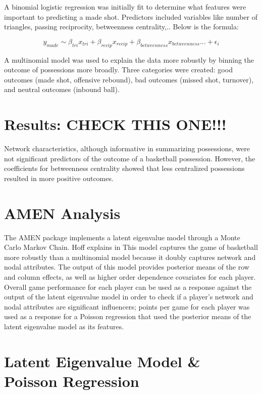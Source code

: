 \documentclass[12pt,twoside]{dukestatscithesis}
\theoremstyle{definition}
\theoremstyle{definition}
\theoremstyle{definition}
\theoremstyle{remark}
\begin{document}
A binomial logistic regression was initially fit to determine what
features were important to predicting a made shot. Predictors included
variables like number of triangles, passing reciprocity, betweenness
centrality,.. Below is the formula:

\[y_{made} \sim \beta_{tri}x_{tri} + \beta_{recip}x_{recip} + \beta_{betweenness}x_{betweenness}... + \epsilon_{i}\]

A multinomial model was used to explain the data more robustly by
binning the outcome of possessions more broadly. Three categories were
created: good outcomes (made shot, offensive rebound), bad outcomes
(missed shot, turnover), and neutral outcomes (inbound ball).

\section{Results: CHECK THIS ONE!!!}\label{results-check-this-one}

Network characteristics, although informative in summarizing
possessions, were not significant predictors of the outcome of a
basketball possession. However, the coefficients for betweenness
centrality showed that less centralized possessions resulted in more
positive outcomes.

\section{AMEN Analysis}\label{amen-analysis}

The AMEN package implements a latent eigenvalue model through a Monte
Carlo Markov Chain. Hoff explains in This model captures the game of
basketball more robustly than a multinomial model because it doubly
captures network and nodal attributes. The output of this model provides
posterior means of the row and column effects, as well as higher order
dependence covariates for each player. Overall game performance for each
player can be used as a response against the output of the latent
eigenvalue model in order to check if a player's network and nodal
attributes are significant influencers; points per game for each player
was used as a response for a Poisson regression that used the posterior
means of the latent eigenvalue model as its features.

\section{Latent Eigenvalue Model \& Poisson
Regression}\label{latent-eigenvalue-model-poisson-regression}
\end{document}
